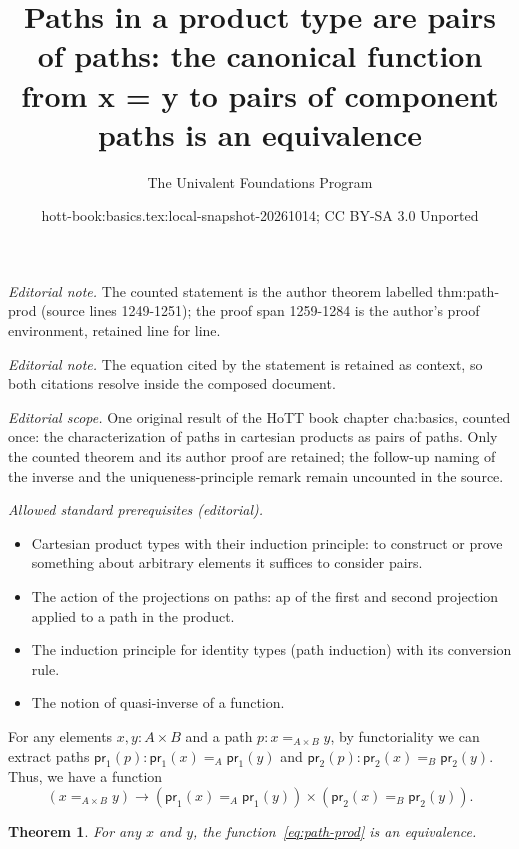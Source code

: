 \documentclass[10pt,a4paper]{article}
\title{Paths in a product type are pairs of paths: the canonical function from x = y to pairs of component paths is an equivalence}
\author{The Univalent Foundations Program}
\date{hott-book:basics.tex:local-snapshot-20261014; CC BY-SA 3.0 Unported}
\newcounter{chapter}
\newcommand{\proj}[1]{\ensuremath{\mathsf{pr}_{#1}}\xspace}
\newcommand{\id}[3][]{\ensuremath{#2 =_{#1} #3}\xspace}
\newcommand{\map}[2]{\ensuremath{{#1}\mathopen{}\left({#2}\right)\mathclose{}}\xspace}
\let\ap\map
\newtheorem{thm}{Theorem}[section]
\theoremstyle{definition}
\theoremstyle{remark}
\numberwithin{equation}{section}
\begin{document}
\maketitle
\noindent\textit{Editorial note.} The counted statement is the author theorem labelled thm:path-prod (source lines 1249-1251); the proof span 1259-1284 is the author's proof environment, retained line for line.\par\medskip
\noindent\textit{Editorial note.} The equation cited by the statement is retained as context, so both citations resolve inside the composed document.\par\medskip
\noindent\textit{Editorial scope.} One original result of the HoTT book chapter cha:basics, counted once: the characterization of paths in cartesian products as pairs of paths. Only the counted theorem and its author proof are retained; the follow-up naming of the inverse and the uniqueness-principle remark remain uncounted in the source.\par\medskip
\noindent\textit{Allowed standard prerequisites (editorial).}\begin{itemize}
\item Cartesian product types with their induction principle: to construct or prove something about arbitrary elements it suffices to consider pairs.
\item The action of the projections on paths: ap of the first and second projection applied to a path in the product.
\item The induction principle for identity types (path induction) with its conversion rule.
\item The notion of quasi-inverse of a function.
\end{itemize}\medskip
For any elements $x,y:A\times B$ and a path $p:\id[A\times B]{x}{y}$, by functoriality we can extract paths $\ap{\proj1}p:\id[A]{\proj1(x)}{\proj1(y)}$ and $\ap{\proj2}p:\id[B]{\proj2(x)}{\proj2(y)}$.
Thus, we have a function
\begin{equation}\label{eq:path-prod}
  (\id[A\times B]{x}{y}) \to (\id[A]{\proj1(x)}{\proj1(y)}) \times (\id[B]{\proj2(x)}{\proj2(y)}).
\end{equation}

\begin{thm}\label{thm:path-prod}
  For any $x$ and $y$, the function~\eqref{eq:path-prod} is an equivalence.
\end{thm}
\end{document}
